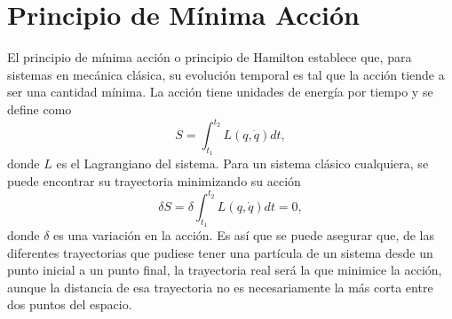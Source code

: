 \documentclass[a4paper,openright,12pt]{book}
\begin{document}
\appendix 

\chapter{Principio de Mínima Acción}\label{Apend. A}
El principio de mínima acción o principio de Hamilton establece que, para sistemas en mecánica clásica, su evolución temporal es tal que la acción tiende a ser una cantidad mínima. La acción tiene unidades de energía por tiempo y se define como 
\begin{equation}
S = \int_{t_{1}}^{t_{2}}L(q,\dot{q})dt,\label{A1}
\end{equation}
donde $L$ es el Lagrangiano del sistema. Para un sistema clásico cualquiera, se puede encontrar su trayectoria minimizando su acción
\begin{equation}
\delta S = \delta \int_{t_{1}}^{t_{2}}L(q,\dot{q})dt = 0,\label{A2}
\end{equation} 
donde $\delta$ es una variación en la acción. Es así que se puede asegurar que, de las diferentes trayectorias que pudiese tener una partícula de un sistema desde un punto inicial a un punto final, la trayectoria real será la que minimice la acción, aunque la distancia de esa trayectoria no es necesariamente la más corta entre dos puntos del espacio.
\end{document}

